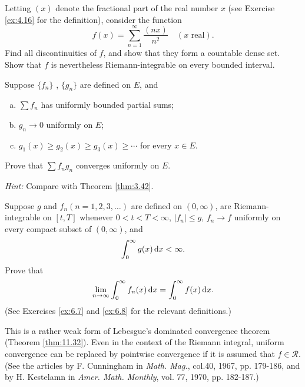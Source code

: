 \begin{myexercise}
    \label{ex:7.10}
    Letting $(x)$ denote the fractional part of the real number $x$
    (see Exercise \ref{ex:4.16} for the definition),
    consider the function
    \begin{equation*}
        f(x) = \sum_{n=1}^{\infty} \frac{(nx)}{n^2} \quad 
        (x \text{ real}).
    \end{equation*}
    Find all discontinuities of $f$,
    and show that they form a countable dense set.
    Show that $f$ is nevertheless Riemann-integrable on every bounded interval.
\end{myexercise}


\begin{myexercise}
    \label{ex:7.11}
    Suppose $\{f_n\}$ , $\{g_n\}$ are defined on $E$, and 
    \begin{enumerate}[(a)]
        \item $\sum f_n$ has uniformly bounded partial sums;
        \item $g_n \rightarrow 0$ uniformly on $E$;
        \item $g_1(x) \geq g_2(x) \geq g_3(x) \geq \cdots$ for every $x \in E$.
    \end{enumerate}
    
    Prove that $\sum f_n g_n$ converges uniformly on $E$.

    \emph{Hint:} Compare with Theorem \ref{thm:3.42}.
\end{myexercise}


\begin{myexercise}
    \label{ex:7.12}
    Suppose $g$ and $f_n(n=1,2,3,\dots)$ are defined on $(0,\infty)$, are Riemann-integrable on $[t,T]$ whenever $0 < t < T < \infty$, $|f_n| \leq g$, $f_n \rightarrow f$ uniformly on every compact subset of $(0, \infty)$, and 
    \begin{equation*}
        \int_{0}^{\infty} g(x) \d x < \infty .
    \end{equation*}
    Prove that 
    \begin{equation*}
        \lim_{n \to \infty} \int_{0}^{\infty} f_n (x) \d x = 
        \int_{0}^{\infty} f(x) \d x .
    \end{equation*}
    (See Exercises \ref{ex:6.7} and \ref{ex:6.8} for the relevant definitions.)

    This is a rather weak form of Lebesgue's dominated convergence theorem (Theorem \ref{thm:11.32}).
    Even in the context of the Riemann integral, uniform convergence can be replaced by pointwise convergence if it is assumed that $f \in \mathscr{R}$.
    (See the articles by F. Cunningham in \emph{Math. Mag.}, col.40, 1967, pp. 179-186, and by H. Kestelamn in \emph{Amer. Math. Monthly}, vol. 77, 1970, pp. 182-187.)
\end{myexercise}


